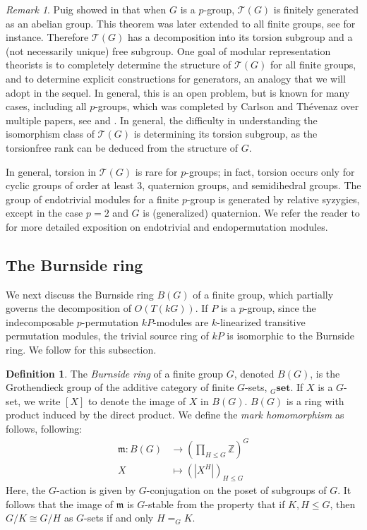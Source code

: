 \documentclass[10pt,letterpaper, boxed, cm]{amsart}
\newcommand{\Z}{\mathbb{Z}}
\newcommand{\calT}{\mathcal{T}}
\theoremstyle{remark}
\newtheorem{remark}[theorem]{Remark}
\theoremstyle{definition}
\newtheorem{definition}[theorem]{Definition}
\begin{document}
	\begin{remark}
		Puig showed in \cite[Corollary 2.4]{Pu90} that when $G$ is a $p$-group, $\calT(G)$ is finitely generated as an abelian group. This theorem was later extended to all finite groups, see \cite[Corollary 2.5]{CMN06} for instance. Therefore $\calT(G)$ has a decomposition into its torsion subgroup and a (not necessarily unique) free subgroup. One goal of modular representation theorists is to completely determine the structure of $\calT(G)$ for all finite groups, and to determine explicit constructions for generators, an analogy that we will adopt in the sequel. In general, this is an open problem, but is known for many cases, including all $p$-groups, which was completed by Carlson and Th\'evenaz over multiple papers, see \cite{CaTh00} and \cite{CT04}. In general, the difficulty in understanding the isomorphism class of $\calT(G)$ is determining its torsion subgroup, as the torsionfree rank can be deduced from the structure of $G$.

		In general, torsion in $\calT(G)$ is rare for $p$-groups; in fact, torsion occurs only for cyclic groups of order at least 3, quaternion groups, and semidihedral groups. The group of endotrivial modules for a finite $p$-group is generated by relative syzygies, except in the case $p = 2$ and $G$ is (generalized) quaternion. We refer the reader to \cite{Ma18} for more detailed exposition on endotrivial and endopermutation modules.
	\end{remark}

	\subsection{The Burnside ring}

	We next discuss the Burnside ring $B(G)$ of a finite group, which partially governs the decomposition of $O(T(kG))$. If $P$ is a $p$-group, since the indecomposable $p$-permutation $kP$-modules are $k$-linearized transitive permutation modules, the trivial source ring of $kP$ is isomorphic to the Burnside ring. We follow \cite{Bou10} for this subsection.

	\begin{definition}
		The \textit{Burnside ring} of a finite group $G$, denoted $B(G)$, is the Grothendieck group of the additive category of finite $G$-sets, ${}_G\textbf{set}$. If $X$ is a $G$-set, we write $[X]$ to denote the image of $X$ in $B(G)$. $B(G)$ is a ring with product induced by the direct product. We define the \textit{mark homomorphism} as follows, following:
		\begin{align*}
		\mathfrak{m}: B(G) &\to \left(\prod_{H\leq G} \Z \right)^G\\
		X &\mapsto (|X^H|)_{H\leq G}
		\end{align*}
		Here, the $G$-action is given by $G$-conjugation on the poset of subgroups of $G$. It follows that the image of $\mathfrak{m}$ is $G$-stable from the property that if $K, H \leq G$, then $G/K\cong G/H$ as $G$-sets if and only $H =_G K$.
	\end{definition}
\end{document}
